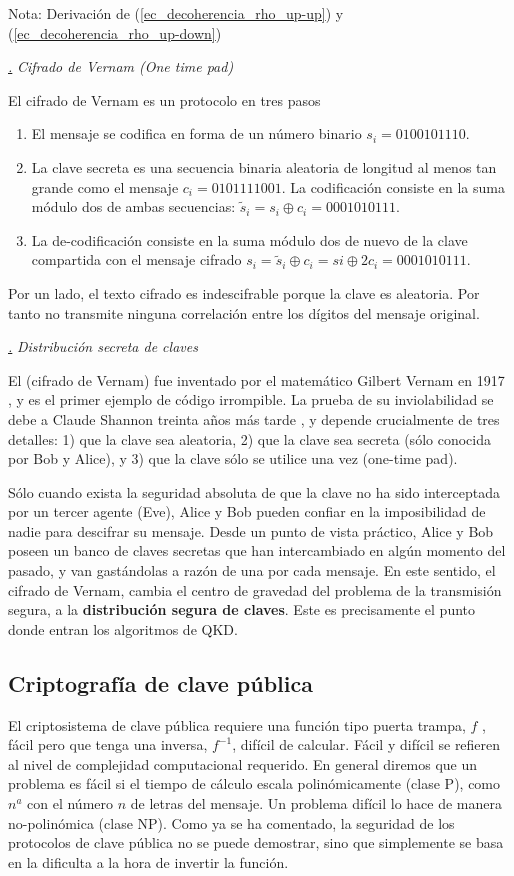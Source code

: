 \documentclass[a4paper,11pt]{book} %
\numberwithin{equation}{chapter}
\def\subsubiContadorIt{\par\addtocounter{subsubsection}{1}\underline{\it\thesubsubsection.}\hskip0.5cm \setcounter{subsubsubsectionIt}{0}}
\newcommand{\SubsubiIt}[1]{
		\subsubiContadorIt \textit{#1}
	}
\newcounter{subsubsubsectionIt}[subsubsection]
\begin{document}
\begin{mybox_blue}{Nota: Derivación de (\ref{ec_decoherencia_rho_up-up}) y  (\ref{ec_decoherencia_rho_up-down})}
			\SubsubiIt{Cifrado de Vernam (One time pad)}

El cifrado de Vernam es un protocolo en tres pasos
\begin{enumerate}
	\item El mensaje se codifica en forma de un número binario $s_i = 0100101110$.
	\item La clave secreta es una secuencia binaria aleatoria de longitud al menos tan grande como el mensaje $c_i = 0101111001$. La codificación consiste en la suma módulo dos de ambas secuencias: 
	$\tilde{s}_i = s_i \oplus c_i = 0001010111$.
	\item La de-codificación consiste en la suma módulo dos de nuevo de la clave compartida con el mensaje cifrado $s_i = \tilde{s}_i \oplus c_i = si \oplus 2c_i = 0001010111$.
\end{enumerate}
Por un lado, el texto cifrado es indescifrable porque la clave es aleatoria. Por tanto no transmite ninguna correlación entre los dígitos del mensaje original.

			\SubsubiIt{Distribución secreta de claves}
			
El (cifrado de Vernam) fue inventado por el matemático Gilbert Vernam en 1917 \cite{Vernam-1926}, y es el primer ejemplo
de código irrompible. La prueba de su inviolabilidad se debe a Claude Shannon treinta años más tarde \cite{Shannon-1949},
y depende crucialmente de tres detalles: 1) que la clave sea aleatoria, 2) que la clave sea secreta (sólo
conocida por Bob y Alice), y 3) que la clave sólo se utilice una vez (one-time pad).

Sólo cuando exista la seguridad absoluta de que la clave no ha sido interceptada por un tercer agente
(Eve), Alice y Bob pueden confiar en la imposibilidad de nadie para descifrar su mensaje. Desde un
punto de vista práctico, Alice y Bob poseen un banco de claves secretas que han intercambiado en algún
momento del pasado, y van gastándolas a razón de una por cada mensaje. En este sentido, el cifrado de
Vernam, cambia el centro de gravedad del problema de la transmisión segura, a la \textbf{distribución segura de
claves}. Este es precisamente el punto donde entran los algoritmos de QKD.


		\subsection{Criptografía de clave pública}

	El criptosistema de clave pública requiere una función tipo puerta trampa, $f$ , fácil pero que tenga una inversa, $f^{-1}$, difícil de calcular. Fácil y difícil se refieren al nivel de complejidad computacional requerido. En general diremos que un problema es fácil si el tiempo de cálculo escala polinómicamente (clase P), como $n^a$ con el número $n$ de letras del mensaje. Un problema difícil lo hace de manera no-polinómica (clase NP). Como ya se ha comentado, la seguridad de los protocolos de clave pública no se puede demostrar, sino que simplemente se basa en la dificulta a la hora de invertir la función. 
	

\end{mybox_blue}
\end{document}
